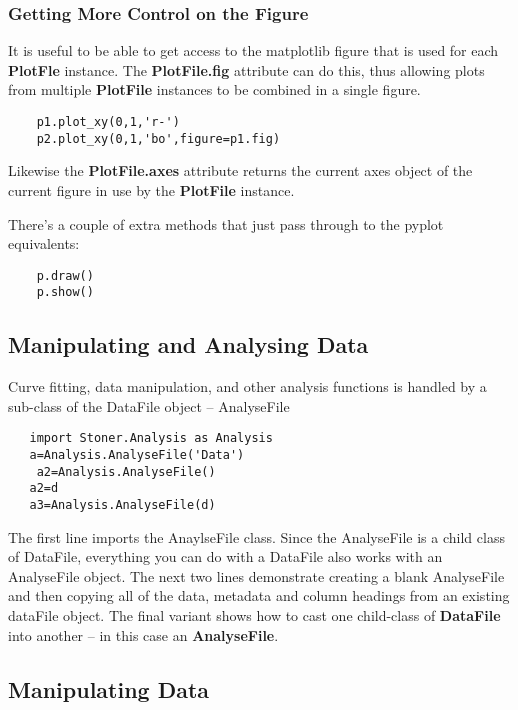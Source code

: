 \documentclass[a4paper,11pt]{scrartcl}
\begin{document}
 \subsubsection{Getting More Control on the Figure}

 It is useful to be able to get access to the matplotlib figure that is used for each \textbf{PlotFle} instance. The \textbf{PlotFile.fig} attribute can do this, thus allowing plots from multiple \textbf{PlotFile} instances to be combined in a single figure.

 \begin{lstlisting}
    p1.plot_xy(0,1,'r-')
    p2.plot_xy(0,1,'bo',figure=p1.fig)
 \end{lstlisting}

 Likewise the \textbf{PlotFile.axes} attribute returns the current axes object of the current figure in use by the \textbf{PlotFile} instance.

 There's a couple of extra methods that just pass through to the pyplot equivalents:

 \begin{lstlisting}
    p.draw()
    p.show()
 \end{lstlisting}



\subsection{Manipulating and Analysing Data}

Curve fitting, data manipulation, and other analysis functions  is handled by a sub-class of the DataFile object -- AnalyseFile

\begin{lstlisting}
   import Stoner.Analysis as Analysis
   a=Analysis.AnalyseFile('Data')
    a2=Analysis.AnalyseFile()
   a2=d
   a3=Analysis.AnalyseFile(d)
\end{lstlisting}

The first line imports the AnaylseFile class. Since the AnalyseFile is a child
class of DataFile, everything you can do with a DataFile also works with an
AnalyseFile object. The next two lines demonstrate creating a blank AnalyseFile
and then copying all of the data, metadata and column headings from an existing
dataFile object. The final variant shows how to cast one child-class of \textbf{DataFile} into another -- in this case an \textbf{AnalyseFile}.

\subsection{Manipulating Data}
\end{document}

